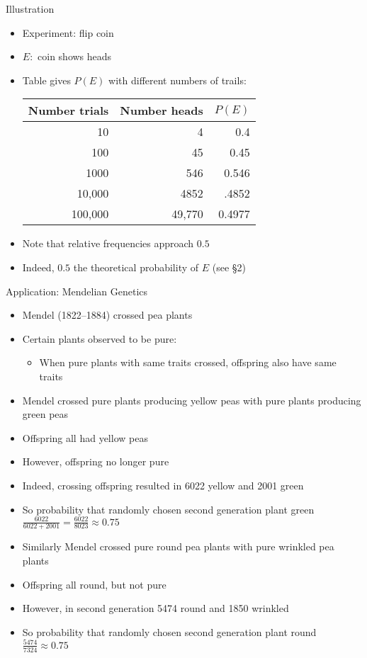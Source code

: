 \documentclass{beamer}
\theoremstyle{definition}
\begin{document}
\begin{frame}{Illustration}
\begin{itemize}
\item Experiment: flip coin
\item $E:$ coin shows heads
\item Table gives $P\left(E\right)$ with different numbers of trails:
\begin{center}\begin{tabular}{rrr}
Number trials&Number heads&$P\left(E\right)$\\\hline
10&4&0.4\\
100&45&0.45\\
1000&546&0.546\\
10,000&4852&.4852\\
100,000&49,770&0.4977
\end{tabular}\end{center}
\item Note that relative frequencies approach $0.5$
\item Indeed, $0.5$ the theoretical probability of $E$
(see \S2)
\end{itemize}
\end{frame}

\begin{frame}{Application: Mendelian Genetics}
\begin{itemize}
\item Mendel (1822--1884) crossed pea plants 
\item Certain plants observed to be \alert{pure}:
\begin{itemize}
\item When pure plants with same traits crossed,
offspring also have same traits
\end{itemize}
\item Mendel crossed pure plants producing yellow peas
with pure plants producing green peas
\item Offspring all had yellow peas
\item However, offspring no longer pure
\item Indeed, crossing offspring resulted in 
6022 yellow and 2001 green
\item So probability that randomly chosen second generation plant green
$\frac{6022}{6022+2001}=\frac{6022}{8023}\approx 0.75$
\end{itemize}
\end{frame}

\begin{frame}
\begin{itemize}
\item Similarly Mendel crossed pure round pea plants with pure wrinkled pea plants
\item Offspring all round, but not pure
\item However, in second generation 5474 round and 1850 wrinkled
\item So probability that randomly chosen second generation plant round
$\frac{5474}{7324}\approx 0.75$
\end{itemize}
\end{frame}
\end{document}

